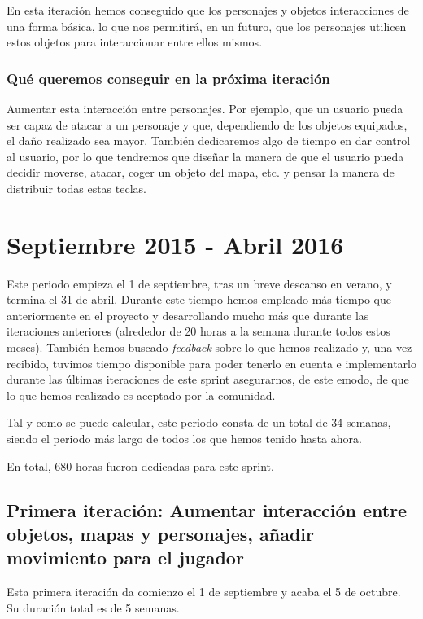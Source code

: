 En esta iteración hemos conseguido que los personajes y objetos interacciones de una forma básica, lo que nos permitirá, en un futuro, que los personajes utilicen estos objetos para interaccionar entre ellos mismos.

\subsubsection{Qué queremos conseguir en la próxima iteración}

Aumentar esta interacción entre personajes. Por ejemplo, que un usuario pueda ser capaz de atacar a un personaje y que, dependiendo de los objetos equipados, el daño realizado sea mayor. 
También dedicaremos algo de tiempo en dar control al usuario, por lo que tendremos que diseñar la manera de que el usuario pueda decidir moverse, atacar, coger un objeto del mapa, etc. y pensar la manera de distribuir todas estas teclas.

\section{Septiembre 2015 - Abril 2016}

Este periodo empieza el 1 de septiembre, tras un breve descanso en verano, y termina el 31 de abril. Durante este tiempo hemos empleado más tiempo que anteriormente en el proyecto y desarrollando mucho más que durante las iteraciones anteriores (alrededor de 20 horas a la semana durante todos estos meses). También hemos buscado \textit{feedback} sobre lo que hemos realizado y, una vez recibido, tuvimos tiempo disponible para poder tenerlo en cuenta e implementarlo durante las últimas iteraciones de este sprint asegurarnos, de este emodo, de que lo que hemos realizado es aceptado por la comunidad.

Tal y como se puede calcular, este periodo consta de un total de 34 semanas, siendo el periodo más largo de todos los que hemos tenido hasta ahora.

En total, 680 horas fueron dedicadas para este sprint.

\subsection{Primera iteración: Aumentar interacción entre objetos, mapas y personajes, añadir movimiento para el jugador}

Esta primera iteración da comienzo el 1 de septiembre y acaba el 5 de octubre. Su duración total es de 5 semanas.

